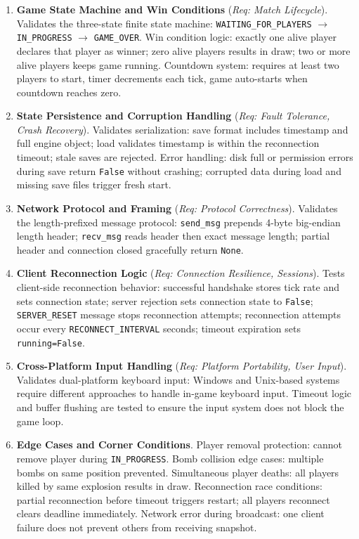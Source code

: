 \begin{enumerate}
    \item \textbf{Game State Machine and Win Conditions} (\textit{Req: Match Lifecycle}).
          Validates the three-state finite state machine: \texttt{WAITING\_FOR\_PLAYERS} $\rightarrow$ \texttt{IN\_PROGRESS} $\rightarrow$ \texttt{GAME\_OVER}.
          Win condition logic: exactly one alive player declares that player as winner; zero alive players results in draw; two or more alive players keeps game running.
          Countdown system: requires at least two players to start, timer decrements each tick, game auto-starts when countdown reaches zero.

    \item \textbf{State Persistence and Corruption Handling} (\textit{Req: Fault Tolerance, Crash Recovery}).
          Validates serialization: save format includes timestamp and full engine object; load validates timestamp is within the reconnection timeout; stale saves are rejected.
          Error handling: disk full or permission errors during save return \texttt{False} without crashing; corrupted data during load and missing save files trigger fresh start.

    \item \textbf{Network Protocol and Framing} (\textit{Req: Protocol Correctness}).
          Validates the length-prefixed message protocol: \texttt{send\_msg} prepends 4-byte big-endian length header; \texttt{recv\_msg} reads header then exact message length; partial header and connection closed gracefully return \texttt{None}.

    \item \textbf{Client Reconnection Logic} (\textit{Req: Connection Resilience, Sessions}).
          Tests client-side reconnection behavior: successful handshake stores tick rate and sets connection state; server rejection sets connection state to \texttt{False}; \texttt{SERVER\_RESET} message stops reconnection attempts; reconnection attempts occur every \texttt{RECONNECT\_INTERVAL} seconds; timeout expiration sets \texttt{running=False}.

    \item \textbf{Cross-Platform Input Handling} (\textit{Req: Platform Portability, User Input}).
          Validates dual-platform keyboard input: Windows and Unix-based systems require different approaches to handle in-game keyboard input.
          Timeout logic and buffer flushing are tested to ensure the input system does not block the game loop.

    \item \textbf{Edge Cases and Corner Conditions}.
          Player removal protection: cannot remove player during \texttt{IN\_PROGRESS}.
          Bomb collision edge cases: multiple bombs on same position prevented.
          Simultaneous player deaths: all players killed by same explosion results in draw.
          Reconnection race conditions: partial reconnection before timeout triggers restart; all players reconnect clears deadline immediately.
          Network error during broadcast: one client failure does not prevent others from receiving snapshot.
\end{enumerate}

